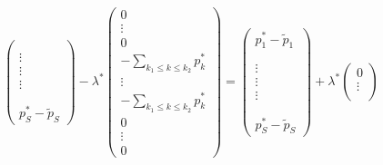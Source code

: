 \documentclass[abstracton]{scrreprt}
\newenvironment{proof}[1][Proof]{\begin{trivlist}
\item[\hskip \labelsep {\bfseries #1}]}{\end{trivlist}}
\begin{document}
\begin{proof}
$$\begin{pmatrix}
                             \\
                             \\
                            \vdots \\
                            \vdots \\
                            \vdots \\
                             \\
                             \\
                            p^{\ast}_{S} - \tilde{p}_{S}
                        \end{pmatrix}
                    - \lambda^{\ast} \begin{pmatrix}
                            0 \\
                            \vdots \\
                            0 \\
                            - \sum_{k_{1} \le k \le k_{2}} p^{\ast}_{k} \\
                            \vdots \\
                            - \sum_{k_{1} \le k \le k_{2}} p^{\ast}_{k} \\
                            0 \\
                            \vdots \\
                            0
                        \end{pmatrix} =
                        \begin{pmatrix}
                            p^{\ast}_{1} - \tilde{p}_{1} \\
                             \\
                             \\
                            \vdots \\
                            \vdots \\
                            \vdots \\
                             \\
                             \\
                            p^{\ast}_{S} - \tilde{p}_{S}
                        \end{pmatrix}
                    + \lambda^{\ast} \begin{pmatrix}
                            0 \\
                            \vdots \\

\end{pmatrix}$$
\end{proof}
\end{document}

